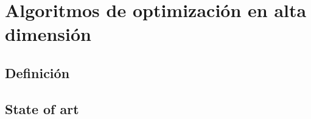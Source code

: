 
\chapter{Algoritmos de optimización en alta dimensión}

\section{Definición}

\section{State of art}


\endinput
